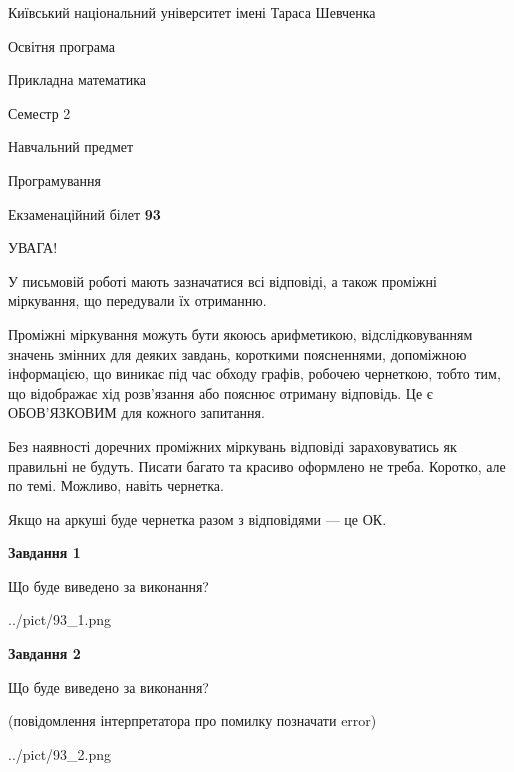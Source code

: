 \documentclass[12pt, ukrainian]{article}
\begin{document}
{{\begin {small}\par
{ \center  Київський національний університет імені Тараса Шевченка \par}
{\parbox {5 cm}{Освітня програма \hfill}{\parbox {7 cm}{Прикладна математика\hfill}}\parbox {6 cm}{\hfill Семестр 2}}\par
{\parbox {5 cm} {Навчальний предмет \hfill}\parbox {7 cm}{Програмування \hfill}\parbox {6cm}{\hfill}\par}\vspace{-7pt} \end{small}}{\center Екзаменаційний білет \No \textbf
{ 93 }\par}}
{
\begin {large}
УВАГА!

У письмовій роботі мають зазначатися всі відповіді, а також проміжні міркування, що передували їх отриманню.

Проміжні міркування можуть бути якоюсь арифметикою, відслідковуванням зна\-чень змінних для деяких завдань,
короткими поясненнями, допоміжною інформацією, що виникає під час обходу графів, робочею чернеткою,
тобто тим, що відображає хід розв’язання або пояснює отриману відповідь.
Це є ОБОВ’ЯЗКОВИМ для кожного запитання.

Без наявності доречних проміжних міркувань відповіді зараховуватись як правиль\-ні не будуть.
Писати багато та красиво оформлено не треба. Коротко, але по темі. Можли\-во, навіть чернетка.

Якщо на аркуші буде чернетка разом з відповідями --- це ОК.

\newpage

{\begin {center}\textbf{Завдання 1}\end {center}}\par
Що буде виведено за виконання?\par
\begin{center}
	{../pict/93_1.png}
\end{center}
\newpage

{\begin {center}\textbf{Завдання 2}\end {center}}\par
Що буде виведено за виконання?\par
 (повідомлення інтерпретатора про помилку позначати error)\par
\begin{center}
	{../pict/93_2.png}
\end{center}
\newpage


\end{large}}
\end{document}
